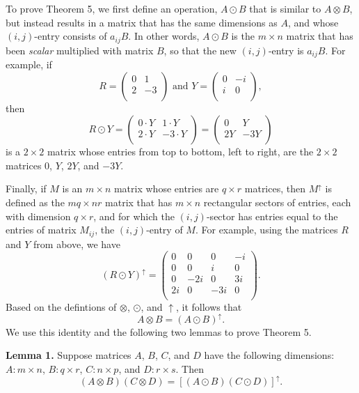 \documentclass [12pt]{article}
\theoremstyle{definition}
\begin{document}
To prove Theorem 5, we first define an operation, $A\odot B$ that is similar to $A\otimes B$, but instead results in a matrix that has the same dimensions as $A$,
and whose $(i,j)$-entry consists of $a_{ij}B$. In other words, $A\odot B$ is the $m\times n$ matrix that has been \textit{scalar} multiplied with matrix $B$, so that
the new $(i,j)$-entry is $a_{ij}B$. For example, if 
\[R=
\left(\begin{array}{cc}
0 & 1\\
2 &  -3 \\
\end{array}\right)
\mbox{ and } 
Y=
\left(\begin{array}{cc}
0 & -i\\
i &  0 \\
\end{array}\right),
\]
then
\[R\odot Y=
\left(\begin{array}{cc}
0\cdot Y & 1\cdot Y\\
2\cdot Y &  -3\cdot Y \\
\end{array}\right)
=
\left(\begin{array}{cc}
0 & Y\\
2Y &  -3Y \\
\end{array}\right)
\]
is a $2\times 2$ matrix whose entries from top to bottom, left to right, are the $2\times 2$ matrices $0$, $Y$, $2Y$, and $-3Y$. 

Finally, if $M$ is an $m\times n$ matrix whose entries are $q\times r$ matrices, then $M^{\uparrow}$ is defined as the $mq\times nr$ matrix 
that has $m\times n$ rectangular sectors of entries, each with dimension $q\times r$, and for which the $(i,j)$-sector has entries equal to the entries of matrix $M_{ij}$, the
$(i,j)$-entry of $M$. For example, using the matrices $R$ and $Y$ from above, we have 
\[(R\odot Y)^{\uparrow} = 
\left(\begin{array}{cccc}
0  & 0 & 0 & -i\\
0 &  0 & i & 0\\
0 & -2i &  0 & 3i\\
2i & 0 & -3i & 0\\
\end{array}\right).
\]
Based on the defintions of $\otimes$, $\odot$, and $\uparrow$, it follows that 
\[A\otimes B = (A\odot B)^{\uparrow}.\]
We use this identity and the following two lemmas to prove Theorem 5.

\textbf{Lemma 1.} Suppose matrices $A$, $B$, $C$, and $D$ have the following dimensions: $A:m\times n$, $B:q\times r$, $C:n\times p$, and $D:r\times s$. 
Then 
\[(A\otimes B)(C\otimes D) = [(A\odot B)(C\odot D)]^{\uparrow}.\]
\end{document}

